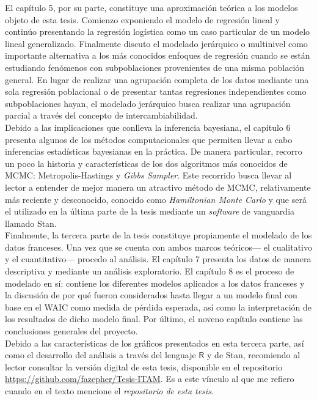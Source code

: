 El capítulo 5, por su parte, constituye una aproximación teórica a los modelos objeto de esta tesis. Comienzo exponiendo el modelo de regresión lineal y continúo presentando la regresión logística como un caso particular de un modelo lineal generalizado. Finalmente discuto el modelado jerárquico o multinivel como importante alternativa a los más conocidos enfoques de regresión cuando se están estudiando fenómenos con subpoblaciones provenientes de una misma población general. En lugar de realizar una agrupación completa de los datos mediante una sola regresión poblacional o de presentar tantas regresiones independientes como subpoblaciones hayan, el modelado jerárquico busca realizar una agrupación parcial a través del concepto de intercambiabilidad.\\

Debido a las implicaciones que conlleva la inferencia bayesiana, el capítulo 6 presenta algunos de los métodos computacionales que permiten llevar a cabo inferencias estadísticas bayesianas en la práctica. De manera particular, recorro un poco la historia y características de los dos algoritmos más conocidos de MCMC: Metropolis-Hastings y \textit{Gibbs Sampler}. Este recorrido busca llevar al lector a entender de mejor manera un atractivo método de MCMC, relativamente más reciente y desconocido, conocido como \textit{Hamiltonian Monte Carlo} y que será el utilizado en la última parte de la tesis mediante un \textit{software} de vanguardia llamado Stan.\\

Finalmente, la tercera parte de la tesis constituye propiamente el modelado de los datos franceses. Una vez que se cuenta con ambos marcos teóricos--- el cualitativo y el cuantitativo--- procedo al análisis. El capítulo 7 presenta los datos de manera descriptiva y mediante un análisis exploratorio. El capítulo 8 es el proceso de modelado en sí: contiene los diferentes modelos aplicados a los datos franceses y la discusión de por qué fueron considerados hasta llegar a un modelo final con base en el WAIC como medida de pérdida esperada, así como la interpretación de los resultados de dicho modelo final. Por último, el noveno capítulo contiene las conclusiones generales del proyecto.\\ 

Debido a las características de los gráficos presentados en esta tercera parte, así como el desarrollo del análisis a través del lenguaje $\mathsf{R}$ y de Stan, recomiendo al lector consultar la versión digital de esta tesis, disponible en el repositorio \url{https://github.com/fazepher/Tesis-ITAM}. Es a este vínculo al que me refiero cuando en el texto mencione el \textit{repositorio de esta tesis}.
